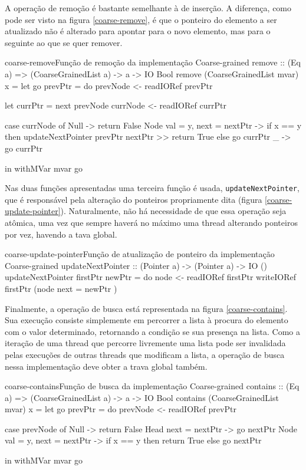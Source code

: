 \documentclass[a4paper,12pt,oldfontcommands]{abntex2}
\begin{document}
A operação de remoção é bastante semelhante à de inserção. A diferença, como pode ser visto na figura \ref{coarse-remove}, é que o ponteiro do elemento a ser atualizado não é alterado para apontar para o novo elemento, mas para o seguinte ao que se quer remover.

\begin{code}{coarse-remove}{Função de remoção da implementação Coarse-grained}
remove :: (Eq a) => (CoarseGrainedList a) -> a -> IO Bool
remove (CoarseGrainedList mvar) x =
    let
        go prevPtr = do
            prevNode <- readIORef prevPtr

            let currPtr = next prevNode
            currNode <- readIORef currPtr

            case currNode of
                Null -> return False
                Node { val = y, next = nextPtr } ->
                    if x == y then updateNextPointer prevPtr nextPtr >> return True
                    else go currPtr
                _ -> go currPtr

    in withMVar mvar go
\end{code}

Nas duas funções apresentadas uma terceira função é usada, \texttt{updateNextPointer}, que é responsável pela alteração do ponteiros propriamente dita (figura \ref{coarse-update-pointer}). Naturalmente, não há necessidade de que essa operação seja atômica, uma vez que sempre haverá no máximo uma thread alterando ponteiros por vez, havendo a tava global.

\begin{code}{coarse-update-pointer}{Função de atualização de ponteiro da implementação Coarse-grained}
updateNextPointer :: (Pointer a) -> (Pointer a) -> IO ()
updateNextPointer firstPtr newPtr = do
    node <- readIORef firstPtr
    writeIORef firstPtr (node { next = newPtr })
\end{code}

Finalmente, a operação de busca está representada na figura \ref{coarse-contains}. Sua execução consiste simplemente em percorrer a lista à procura do elemento com o valor determinado, retornando a condição se sua presença na lista. Como a iteração de uma thread que percorre livremente uma lista pode ser invalidada pelas execuções de outras threads que modificam a lista, a operação de busca nessa implementação deve obter a trava global também.

\begin{code}{coarse-contains}{Função de busca da implementação Coarse-grained}
contains :: (Eq a) => (CoarseGrainedList a) -> a -> IO Bool
contains (CoarseGrainedList mvar) x =
    let
        go prevPtr = do
            prevNode <- readIORef prevPtr

            case prevNode of
                Null -> return False
                Head { next = nextPtr } -> go nextPtr
                Node { val = y, next = nextPtr } ->
                    if x == y then return True
                    else go nextPtr

    in withMVar mvar go
\end{code}
\end{document}
